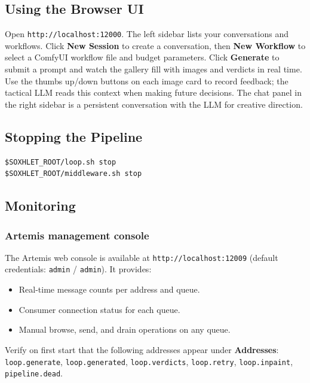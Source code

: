 \documentclass[11pt,letterpaper]{article}
\begin{document}
\subsection{Using the Browser UI}

Open \texttt{http://localhost:12000}. The left sidebar lists your
conversations and workflows. Click \textbf{New Session} to create a
conversation, then \textbf{New Workflow} to select a ComfyUI workflow file
and budget parameters. Click \textbf{Generate} to submit a prompt and watch
the gallery fill with images and verdicts in real time. Use the thumbs
up/down buttons on each image card to record feedback; the tactical LLM
reads this context when making future decisions. The chat panel in the right
sidebar is a persistent conversation with the LLM for creative direction.

\subsection{Stopping the Pipeline}

\begin{lstlisting}[style=shell]
$SOXHLET_ROOT/loop.sh stop
$SOXHLET_ROOT/middleware.sh stop
\end{lstlisting}

\subsection{Monitoring}

\subsubsection{Artemis management console}

The Artemis web console is available at \texttt{http://localhost:12009}
(default credentials: \texttt{admin} / \texttt{admin}). It provides:

\begin{itemize}
  \item Real-time message counts per address and queue.
  \item Consumer connection status for each queue.
  \item Manual browse, send, and drain operations on any queue.
\end{itemize}

Verify on first start that the following addresses appear under
\textbf{Addresses}: \texttt{loop.generate}, \texttt{loop.generated},
\texttt{loop.verdicts}, \texttt{loop.retry}, \texttt{loop.inpaint},
\texttt{pipeline.dead}.
\end{document}
